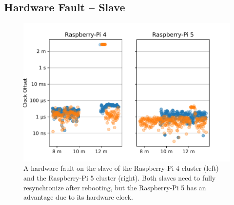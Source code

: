 \subsection{Hardware Fault -- Slave}
\xdef\maxPiFour{\cmpMax}

\xdef\maxPiFive{\cmpMax}


\begin{figure}
    \includegraphics[width=\linewidth]{res/generated/fault/hardware/slave_cluster_comparison.pdf}
    \caption{A hardware fault on the slave of the Raspberry-Pi 4 cluster (left) and the Raspberry-Pi 5 cluster (right). Both slaves need to fully resynchronize after rebooting, but the Raspberry-Pi 5 has an advantage due to its hardware clock.}
    \label{fig:hardware_fault_slave}
\end{figure}

